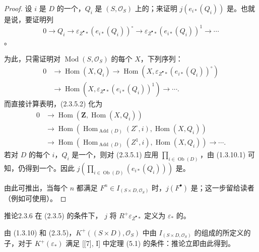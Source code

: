 \begin{proof}
设 $i$ 是 $D$ 的一个，$Q_i$ 是 $(S,\mathcal O_S)$ 上的；来证明 $j(e_{i*}(Q_i))$ 是。也就是说，要证明列
\[
0\longrightarrow Q_i\longrightarrow\varepsilon_{Z^\bullet*}(e_{i*}(Q_i))^\circ
\longrightarrow\varepsilon_{Z^\bullet*}(e_{i*}(Q_i))^1\longrightarrow\cdots \tag{2.3.5.1}
\]
。

为此，只需证明对 $\operatorname{Mod}(S,\mathcal O_S)$ 的每个 $X$，下列序列：
\[
\begin{aligned}
0&\longrightarrow\operatorname{Hom}(X,Q_i)
\longrightarrow\operatorname{Hom}(X,\varepsilon_{Z^\bullet*}(e_{i*}(Q_i))^\circ)\\
&\longrightarrow\operatorname{Hom}(X,\varepsilon_{Z^\bullet*}(e_{i*}(Q_i))^1)
\longrightarrow\cdots. 
\end{aligned}\tag{2.3.5.2}
\]
而直接计算表明，(2.3.5.2) 化为
\[
\begin{aligned}
0&\longrightarrow\operatorname{Hom}(\mathbf Z,\operatorname{Hom}(X,Q_i))\\
&\longrightarrow\operatorname{Hom}(\operatorname{Hom}_{\operatorname{Add}(D)}(Z^\circ,i),\operatorname{Hom}(X,Q_i))\\
&\longrightarrow\operatorname{Hom}(\operatorname{Hom}_{\operatorname{Add}(D)}(Z^1,i),\operatorname{Hom}(X,Q_i))\longrightarrow\cdots.
\end{aligned}\tag{2.3.5.3}
\]
若对 $D$ 的每个 $i$，$Q_i$ 是一个，则对 (2.3.5.1) 应用 $\prod_{i\in\operatorname{Ob}(D)}$，由 (1.3.10.1) 可知，仍得到一个。因此 $j(\prod_{i\in\operatorname{Ob}(D)}(e_{i*}(Q_i)))$ 是。

由此可推出，当每个 $n$ 都满足 $F^n\in I_{(S\times D,\mathcal O_S)}$ 时，$j(F^\bullet)$ 是；这一步留给读者（例如可使用）。
\end{proof}
\begin{SGAresult}{推论}{2.3.6}
在 (2.3.5) 的条件下， $j$ 将 $R^+\varepsilon_{Z^\bullet*}$ 定义为 $\varepsilon_*$ 的。
\end{SGAresult}
由 (1.3.10) 和 (2.3.5)，$K^+((S\times D),\mathcal O_S)$ 中由 $I_{(S\times D,\mathcal O_S)}$ 的组成的所定义的子，对于 $K^+(\varepsilon_*)$ 满足 [[7], I] 中定理 (5.1) 的条件：推论立即由此得到。

